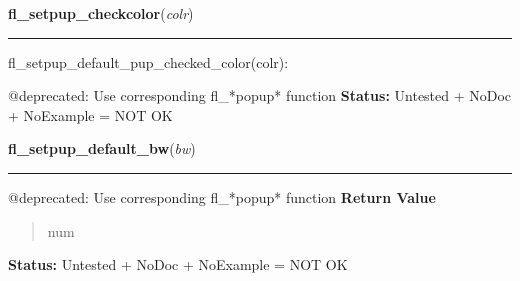     \vspace{0.5ex}

\hspace{.8\funcindent}\begin{boxedminipage}{\funcwidth}

    \raggedright \textbf{fl\_setpup\_checkcolor}(\textit{colr})

    \vspace{-1.5ex}

    \rule{\textwidth}{0.5\fboxrule}
\setlength{\parskip}{2ex}

fl\_setpup\_default\_pup\_checked\_color(colr):

@deprecated: Use corresponding fl\_*popup* function
\setlength{\parskip}{1ex}
\textbf{Status:} 
Untested + NoDoc + NoExample = NOT OK


    \end{boxedminipage}

    \label{xformslib:deprecated:fl_setpup_default_bw}

    \vspace{0.5ex}

\hspace{.8\funcindent}\begin{boxedminipage}{\funcwidth}

    \raggedright \textbf{fl\_setpup\_default\_bw}(\textit{bw})

    \vspace{-1.5ex}

    \rule{\textwidth}{0.5\fboxrule}
\setlength{\parskip}{2ex}

@deprecated: Use corresponding fl\_*popup* function
\setlength{\parskip}{1ex}
      \textbf{Return Value}
    \vspace{-1ex}

      \begin{quote}

num
      \end{quote}

\textbf{Status:} 
Untested + NoDoc + NoExample = NOT OK


    \end{boxedminipage}

    \label{xformslib:deprecated:fl_setpup_shortcut}

